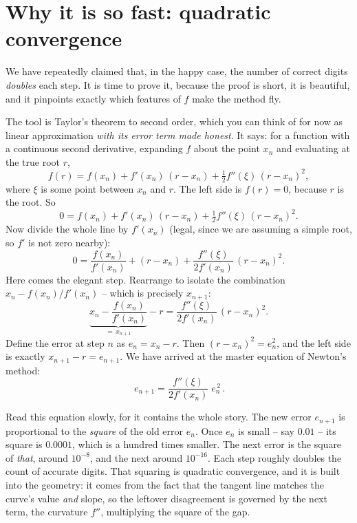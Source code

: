 \section{Why it is so fast: quadratic convergence}
\label{ch19:quadratic}

We have repeatedly claimed that, in the happy case, the number of correct digits
\emph{doubles} each step. It is time to prove it, because the proof is short, it is
beautiful, and it pinpoints exactly which features of $f$ make the method fly.

The tool is Taylor's theorem to second order, which you can think of for now as
linear approximation \emph{with its error term made honest}. It says: for a function
with a continuous second derivative, expanding $f$ about the point $x_n$ and
evaluating at the true root $r$,
\[
  f(r) = f(x_n) + f'(x_n)\,(r - x_n) + \tfrac12 f''(\xi)\,(r - x_n)^2,
\]
where $\xi$ is some point between $x_n$ and $r$. The left side is $f(r) = 0$,
because $r$ is the root. So
\[
  0 = f(x_n) + f'(x_n)\,(r - x_n) + \tfrac12 f''(\xi)\,(r - x_n)^2.
\]
Now divide the whole line by $f'(x_n)$ (legal, since we are assuming a simple root,
so $f'$ is not zero nearby):
\[
  0 = \frac{f(x_n)}{f'(x_n)} + (r - x_n) + \frac{f''(\xi)}{2 f'(x_n)}\,(r - x_n)^2.
\]
Here comes the elegant step. Rearrange to isolate the combination $x_n -
f(x_n)/f'(x_n)$ -- which is precisely $x_{n+1}$:
\[
  \underbrace{x_n - \frac{f(x_n)}{f'(x_n)}}_{=\,x_{n+1}} - r
  = \frac{f''(\xi)}{2 f'(x_n)}\,(r - x_n)^2.
\]
Define the error at step $n$ as $e_n = x_n - r$. Then $(r - x_n)^2 = e_n^2$, and the
left side is exactly $x_{n+1} - r = e_{n+1}$. We have arrived at the master equation
of Newton's method:
\[
  \boxed{\,e_{n+1} = \frac{f''(\xi)}{2 f'(x_n)}\; e_n^{\,2}\,}.
\]

\begin{focusbox}
Read this equation slowly, for it contains the whole story. The new error
$e_{n+1}$ is proportional to the \emph{square} of the old error $e_n$. Once $e_n$ is
small -- say $0.01$ -- its square is $0.0001$, which is a hundred times smaller. The
next error is the square of \emph{that}, around $10^{-8}$, and the next around
$10^{-16}$. Each step roughly doubles the count of accurate digits. That squaring is
quadratic convergence, and it is built into the geometry: it comes from the fact
that the tangent line matches the curve's value \emph{and} slope, so the leftover
disagreement is governed by the next term, the curvature $f''$, multiplying the
square of the gap.
\end{focusbox}

